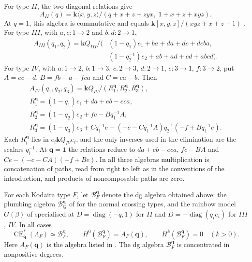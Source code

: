 \documentclass[a4paper]{amsart}
\newcommand{\kk}{\mathbf{k}}
\DeclareMathOperator{\CE}{CE}
\numberwithin{equation}{section}
\begin{document}
For type $II$, the two diagonal relations give
\begin{equation}\label{eq:cusp-algebra}
 A_{II}(q)=\kk\langle x,y,z\rangle/
 (q+x+z+zyx,\;1+x+z+xyz).
\end{equation}
At $q=1$, this algebra is commutative and equals
$\kk[x,y,z]/(xyz+x+z+1)$ \cite[Section~6.1.5]{ELduality}.
For type $III$, with $a,c:1\to2$ and $b,d:2\to1$,
\begin{equation}\label{eq:III-algebra}
\begin{split}
 A_{III}(q_1,q_2)=\kk Q_{III}/\big(&
 (1-q_1)e_1+ba+da+dc+dcba,\\
 &(1-q_2^{-1})e_2+ab+ad+cd+abcd\big).
\end{split}
\end{equation}
For type $IV$, with $a:1\to2$, $b:1\to3$, $c:2\to3$, $d:2\to1$,
$e:3\to1$, $f:3\to2$, put $A=ec-d$, $B=fb-a-fca$ and $C=ca-b$. Then
\begin{equation}\label{eq:IV-algebra}
\begin{gathered}
 A_{IV}(q_1,q_2,q_3)=\kk Q_{IV}/(R_1^{\boldsymbol q},
                    R_2^{\boldsymbol q},R_3^{\boldsymbol q}),\\
 R_1^{\boldsymbol q}=(1-q_1)e_1+da+eb-eca,\\
 R_2^{\boldsymbol q}=(1-q_2)e_2+fc-Bq_1^{-1}A,\\
 R_3^{\boldsymbol q}=(1-q_3)e_3+Cq_1^{-1}e
       -(-c-Cq_1^{-1}A)q_2^{-1}(-f+Bq_1^{-1}e).
\end{gathered}
\end{equation}
Each $R_i^{\boldsymbol q}$ lies in $e_i\kk Q_{IV}e_i$, and the only
inverses used in the elimination are the scalars $q_i^{-1}$. At
$\boldsymbol q=\boldsymbol1$ the relations reduce to $da+eb-eca$,
$fc-BA$ and $Ce-(-c-CA)(-f+Be)$. In all three algebras multiplication
is concatenation of paths, read from right to left as in the
conventions of the introduction, and products of noncomposable paths
are zero.

For each Kodaira type $F$, let $\mathcal B_F^{\boldsymbol q}$ denote
the dg algebra obtained above: the plumbing algebra
$\mathcal B_Q^{\boldsymbol q}$ of  for the normal
crossing types, and the rainbow model $G(\beta)$ of
 specialised at
$D=\operatorname{diag}(-q,1)$ for $II$ and $D=-\operatorname{diag}(q_ie_i)$ for
$III$, $IV$. In all cases
\begin{equation}\label{eq:dg-model-summary}
 \CE^*_{\boldsymbol q}(\Lambda_F)\simeq\mathcal B_F^{\boldsymbol q},
 \qquad
 H^0(\mathcal B_F^{\boldsymbol q})=A_F(\boldsymbol q),
 \qquad
 H^k(\mathcal B_F^{\boldsymbol q})=0\quad(k>0).
\end{equation}
Here $A_F(\boldsymbol q)$ is the algebra listed in .
The dg algebra $\mathcal B_F^{\boldsymbol q}$ is concentrated in
nonpositive degrees.
\end{document}
